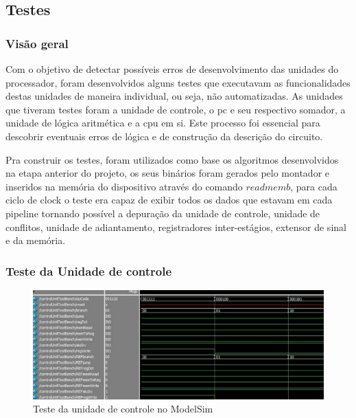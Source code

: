 \documentclass[
	11pt,				%
	openany,			%
	oneside,
	a4paper,			%
	chapter=TITLE,		%
	section=TITLE,		%
	english,			%
	brazil				%
	]{abntex2}
\begin{document}
\subsection{Testes}
\subsubsection{Visão geral}
Com o objetivo de detectar possíveis erros de desenvolvimento das unidades do processador, foram desenvolvidos alguns testes que executavam as funcionalidades destas unidades de maneira individual, ou seja, não automatizadas. As unidades que tiveram testes foram a unidade de controle, o pc e seu respectivo somador, a unidade de lógica aritmética e a cpu em si. Este processo foi essencial para descobrir eventuais erros de lógica e de construção da descrição do circuito.

Pra construir os testes, foram utilizados como base os algoritmos desenvolvidos na etapa anterior do projeto, os seus binários foram gerados pelo montador e inseridos na memória do dispositivo através do comando $readmemb$, para cada ciclo de clock o teste era capaz de exibir todos os dados que estavam em cada pipeline tornando possível a depuração da unidade de controle, unidade de conflitos, unidade de adiantamento, registradores inter-estágios, extensor de sinal e da memória.

\subsubsection{Teste da Unidade de controle}

\begin{figure}[htb]
	\caption{\label{fig_testCpuControl}Teste da unidade de controle no ModelSim}
	\begin{center}
	    \includegraphics[scale=0.8]{testCpuControl.PNG}
	\end{center}
\end{figure}
\end{document}
